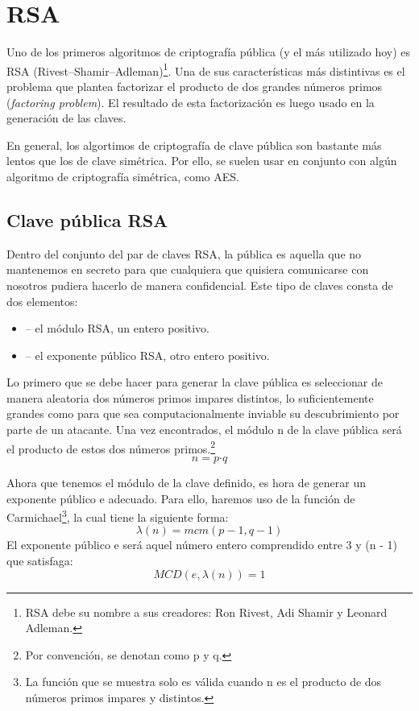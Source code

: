 
\section{RSA}

\label{RSA}

Uno de los primeros algoritmos de criptografía pública (y el más utilizado hoy) es RSA (Rivest–Shamir–Adleman)\footnote{RSA debe su nombre a sus creadores: Ron Rivest, Adi Shamir y Leonard Adleman.}. Una de sus características más distintivas es el problema que plantea factorizar el producto de dos grandes números primos (\emph{factoring problem}). El resultado de esta factorización es luego usado en la generación de las claves.

En general, los algortimos de criptografía de clave pública son bastante más lentos que los de clave simétrica. Por ello, se suelen usar en conjunto con algún algoritmo de criptografía simétrica, como AES. \emph{\parencite{Reference9}}

\subsection{Clave pública RSA}

Dentro del conjunto del par de claves RSA, la pública es aquella que no mantenemos en secreto para que cualquiera que quisiera comunicarse con nosotros pudiera hacerlo de manera confidencial. Este tipo de claves consta de dos elementos:
\begin{itemize}
  \item {} -- el módulo RSA, un entero positivo.
  \item {} -- el exponente público RSA, otro entero positivo.
\end{itemize}

Lo primero que se debe hacer para generar la clave pública es seleccionar de manera aleatoria dos números primos impares distintos, lo suficientemente grandes como para que sea computacionalmente inviable su descubrimiento por parte de un atacante. Una vez encontrados, el módulo n de la clave pública será el producto de estos dos números primos.\footnote{Por convención, se denotan como p y q.}
\[ n = p \boldsymbol{\cdot} q \]

Ahora que tenemos el módulo de la clave definido, es hora de generar un exponente público e adecuado. Para ello, haremos uso de la función de Carmichael\footnote{La función que se muestra solo es válida cuando n es el producto de dos números primos impares y distintos.}, la cual tiene la siguiente forma:
\[ \lambda(n) = mcm(p - 1, q - 1) \]
El exponente público e será aquel número entero comprendido entre 3 y (n - 1) que satisfaga:
\[ MCD(e, \lambda(n)) = 1 \] \emph{\parencite{Reference10}}


